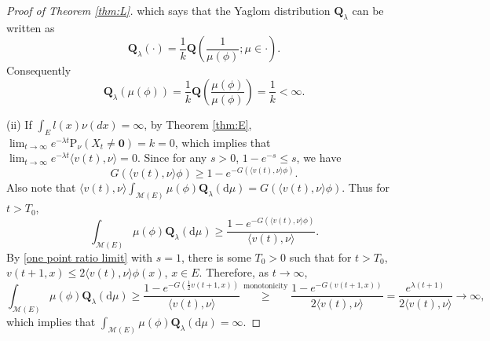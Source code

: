 \documentclass[12pt,a4paper]{amsart}
\numberwithin{equation}{section}
\theoremstyle{plain}
\theoremstyle{definition}
\theoremstyle{remark}
\begin{document}
\begin{proof}[Proof of Theorem \ref{thm:L}]
which says that the Yaglom distribution ${\mathbf Q}_\lambda$ can be written as
\begin{equation}\label{rep: yaglom}
\mathbf Q_\lambda(\cdot)=\dfrac{1}{k}{\mathbf Q}\left(\dfrac{1}{\mu(\phi)}; \mu\in\cdot\right).
\end{equation}
Consequently
\begin{equation}\label{ident: k}
\mathbf Q_\lambda(\mu(\phi))=\dfrac{1}{k}{\mathbf Q}\left(\dfrac{\mu(\phi)}{\mu(\phi) }\right)=\dfrac{1}{k}<\infty.
\end{equation}


(ii) If $\int_El(x)\nu(dx)=\infty$,
by Theorem \ref{thm:E},
$\lim_{t\to\infty}e^{-\lambda t}\mathrm P_\nu(X_t\neq \mathbf 0)=k=0$,
which implies that
 $\lim_{t\to\infty}e^{-\lambda t}\langle v(t),\nu\rangle=0$.  Since for any $s>0$,  $1-e^{-s}\leq s$, we have
$$G(\langle v(t),\nu\rangle\phi)\geq 1-e^{-G(\langle v(t),\nu\rangle\phi)}.$$
Also note that $\langle v(t),\nu\rangle
\int_{\mathcal M(E)}\mu(\phi)\mathbf Q_\lambda(\mathrm d\mu)=G(\langle v(t),\nu\rangle\phi).$
Thus  for $t>T_0$,
\[
\int_{\mathcal M(E)}\mu(\phi)\mathbf Q_\lambda(\mathrm d\mu)
\geq \dfrac{1-e^{-G(\langle v(t),\nu\rangle\phi)}}{\langle v(t),\nu\rangle}.
\]
 By \eqref{one point ratio limit} with $s=1$,
 there is some $T_0>0$ such that for $t>T_0$, $v(t+1,x)\leq 2\langle v(t),\nu\rangle\phi(x)$, $x\in E$.
 Therefore, as $t\to\infty$,
 \[
\int_{\mathcal M(E)}\mu(\phi)\mathbf Q_\lambda(\mathrm d\mu)
\geq \dfrac{1-e^{-G(\frac{1}{2}v(t+1,x))}}{\langle v(t),\nu\rangle}\overset{\text{monotonicity}}\geq
\dfrac{1-e^{-G(v(t+1,x))}}{2\langle v(t),\nu\rangle}
=\dfrac{e^{\lambda(t+1)}}{2\langle v(t),\nu\rangle}\to\infty,
\]
which implies that
$\int_{\mathcal M(E)}\mu(\phi)\mathbf Q_\lambda(\mathrm d\mu)=\infty$.


\end{proof}
\end{document}
